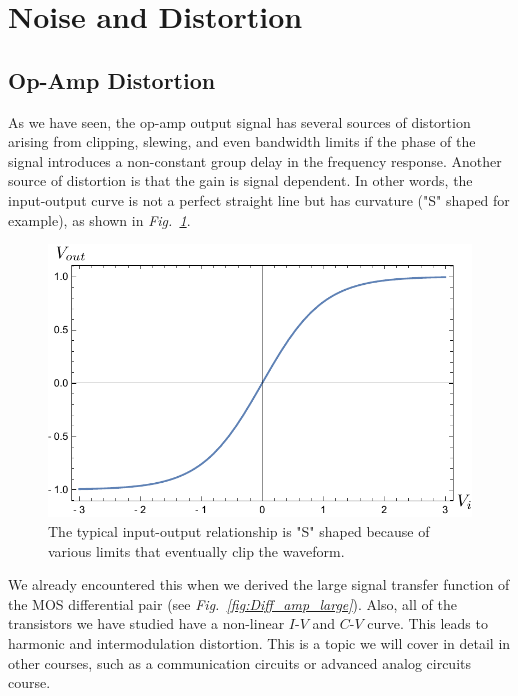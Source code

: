 \section{Noise and Distortion}
\subsection{Op-Amp Distortion}
As we have seen, the op-amp output signal has several sources of distortion arising from clipping, slewing, and even bandwidth limits if the phase of the signal introduces a non-constant group delay in the frequency response.  Another source of distortion is that the gain is signal dependent.  In other words, the input-output curve is not a perfect straight line but has curvature ("S" shaped for example), as shown in \emph{Fig.~\ref{fig:vtanh}}.
\begin{figure}[H]
\centering
\includegraphics[width=.5\columnwidth]{vtanh}
\caption{The typical input-output relationship is "S" shaped because of various limits that eventually clip the waveform.}
\label{fig:vtanh}
\end{figure}
\newpage
We already encountered this when we derived the large signal transfer function of the MOS differential pair (see \emph{Fig.~\ref{fig:Diff_amp_large}}). Also, all of the transistors we have studied have a non-linear $I$-$V$ and $C$-$V$ curve.  This leads to harmonic and intermodulation distortion.  This is a topic we will cover in detail in other courses, such as a communication circuits or advanced analog circuits course.


